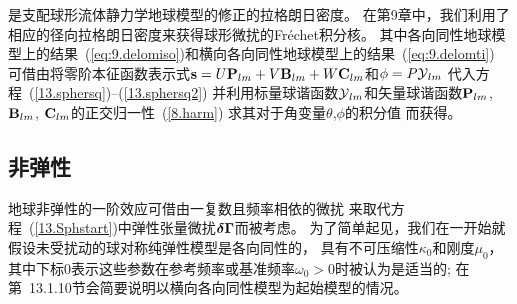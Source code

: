 是支配球形流体静力学地球模型的修正的拉格朗日密度。
在第9章中，我们利用了相应的径向拉格朗日密度来获得球形微扰的Fr\'{e}chet积分核。
其中各向同性地球模型上的结果~(\ref{eq:9.delomiso})和横向各向同性地球模型上的结果~(\ref{eq:9.delomti})
可借由将零阶本征函数表示式$\mbox{${\bf s}$}=U\mbox{${\bf P}$}_{lm}+V\mbox{${\bf B}$}_{lm}+W\mbox{${\bf C}$}_{lm}$和$\phi=P\mbox{$\cal Y$}_{lm}$
代入方程~(\ref{13.sphersq})--(\ref{13.sphersq2})
并利用标量球谐函数$\mbox{$\cal Y$}_{lm}$和矢量球谐函数$\mbox{${\bf P}$}_{lm}$, $\mbox{${\bf B}$}_{lm}$, $\mbox{${\bf C}$}_{lm}$的正交归一性~(\ref{8.harm})
求其对于角变量$\theta$,$\phi$的积分值
而获得。
%
%
%
%

\subsection{非弹性}
%
%

地球非弹性的一阶效应可借由一复数且频率相依的微扰
来取代方程~(\ref{13.Sphstart})中弹性张量微扰$\mbox{\boldmath $\bf \delta$}\mbox{\boldmath $\bf \Gamma$}$而被考虑。
为了简单起见，我们在一开始就假设未受扰动的球对称纯弹性模型是各向同性的，
具有不可压缩性$\kappa_0$和刚度$\mu_0$，
其中下标$0$表示这些参数在参考频率或基准频率$\omega_0 > 0$时被认为是适当的;
在第~13.1.10节会简要说明以横向各向同性模型为起始模型的情况。

